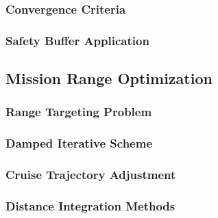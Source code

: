 \documentclass[12pt, a4paper]{report}
\begin{document}
\subsubsection{Convergence Criteria}


\subsubsection{Safety Buffer Application}


 

\subsection{Mission Range Optimization}
\label{subsec:mission_range_optimization}


\subsubsection{Range Targeting Problem}


\subsubsection{Damped Iterative Scheme}


\subsubsection{Cruise Trajectory Adjustment}


\subsubsection{Distance Integration Methods}


 

\newpage
\end{document}
